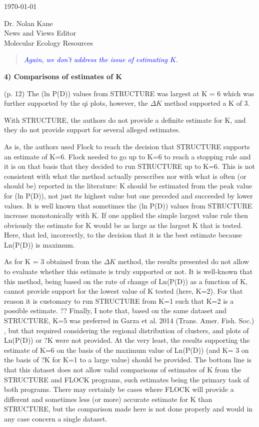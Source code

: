 \documentclass[11pt]{letter}
\newcommand{\reply}[1]{\begin{quotation}\small\sl\textcolor{blue}{#1}\end{quotation}}
\begin{document}
\begin{letter}{ \today 

Dr. Nolan Kane\\
News and Views Editor\\
Molecular Ecology Resources \\
}
\reply{Again, we don't address the issue of estimating $K$. }


{\bf 4) Comparisons of estimates of K}

(p. 12) The (ln P(D)) values from STRUCTURE was largest at K = 6 which was further supported by
the qi plots, however, the $\Delta K$ method supported a K of 3.

With STRUCTURE, the authors do not provide a definite estimate for K, and they do not provide support for several alleged estimates.

As is, the authors used Flock to reach the decision that STRUCTURE supports an estimate of K=6. Flock needed to go up to K=6 to reach a stopping rule and it is on that basis that they decided to run STRUCTURE up to K=6. This is not consistent with what the method actually prescribes nor with what is often (or should be) reported in the literature: K should be estimated from the peak value for (ln P(D)), not just its highest value but one preceded and succeeded by lower values. It is well known that sometimes the (ln P(D)) values from STRUCTURE increase monotonically with K. If one applied the simple largest value rule then obviously the estimate for K would be as large as the largest K that is tested. Here, that led, incorrectly, to the decision that it is the best estimate because Ln(P(D)) is maximum.

As for K = 3 obtained from the $\Delta K$ method, the results presented do not allow to evaluate whether this estimate is truly supported or not. It is well-known that this method, being based on the rate of change of Ln(P(D)) as a function of K, cannot provide support for the lowest value of K tested (here, K=2). For that reason it is customary to run STRUCTURE from K=1 such that K=2 is a possible estimate.
??
Finally, I note that, based on the same dataset and STRUCTURE, K=5 was preferred in Garza et al. 2014 (Trans. Amer. Fish. Soc.) , but that required considering the regional distribution of clusters, and plots of Ln(P(D)) or ?K were not provided.
At the very least, the results supporting the estimate of K=6 on the basis of the maximum value of Ln(P(D)) (and K= 3 on the basis of ?K for K=1 to a large value) should be provided.
The bottom line is that this dataset does not allow valid comparisons of estimates of K from the STRUCTURE and FLOCK programs, such estimates being the primary task of both programs. There may certainly be cases where FLOCK will provide a different and sometimes less (or more) accurate estimate for K than STRUCTURE, but the comparison made here is not done properly and would in any case concern a single dataset.


\end{letter}
\end{document}
